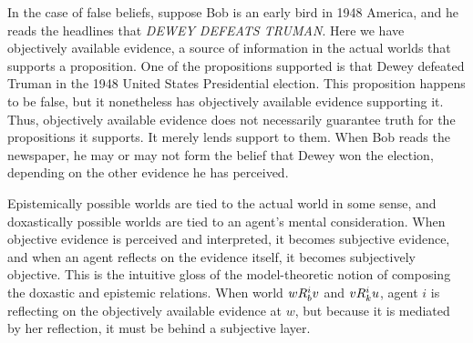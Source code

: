 In the case of false beliefs, suppose Bob is an early bird in 1948 America, and he reads the headlines that \emph{DEWEY DEFEATS TRUMAN}. Here we have objectively available evidence, a source of information in the actual worlds that supports a proposition. One of the propositions supported is that Dewey defeated Truman in the 1948 United States Presidential election. This proposition happens to be false, but it nonetheless has objectively available evidence supporting it. Thus, objectively available evidence does not necessarily guarantee truth for the propositions it supports. It merely lends support to them. When Bob reads the newspaper, he may or may not form the belief that Dewey won the election, depending on the other evidence he has perceived.






 Epistemically possible worlds are tied to the actual world in some sense, and doxastically possible worlds are tied to an agent's mental consideration. When objective evidence is perceived and interpreted, it becomes subjective evidence, and when an agent reflects on the evidence itself, it becomes subjectively objective. This is the intuitive gloss of the model-theoretic notion of composing the doxastic and epistemic relations. When world $wR_{b}^i v$ and $vR_{k}^i u$, agent $i$ is reflecting on the objectively available evidence at $w$, but because it is mediated by her reflection, it must be behind a subjective layer. 
 
